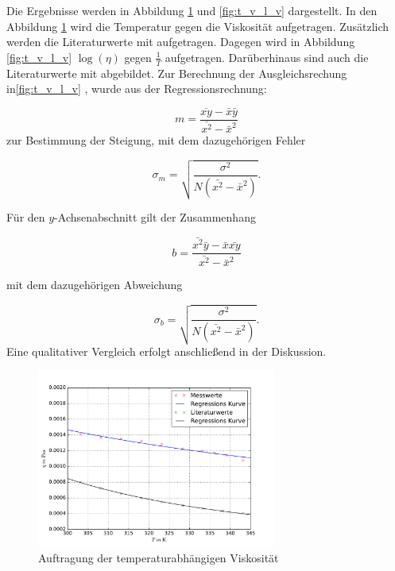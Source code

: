 Die Ergebnisse werden in Abbildung \ref{fig:t_v_v} und \ref{fig:t_v_l_v} dargestellt.
In den Abbildung \ref{fig:t_v_v} wird die Temperatur gegen die Viskosität aufgetragen.
Zusätzlich werden die Literaturwerte \cite{lit_dichte} mit aufgetragen.
Dagegen wird in Abbildung \ref{fig:t_v_l_v} $\log(\eta)$ gegen $\frac{1}{T}$ aufgetragen.
Darüberhinaus sind auch die Literaturwerte \cite{lit_dichte} mit abgebildet.
Zur Berechnung der Ausgleichsrechung in\ref{fig:t_v_l_v} , wurde aus der Regressionsrechnung:

\begin{equation*}
m=\frac{\overline{xy}-\bar{x}\bar{y}}{\bar{x^2}-\bar{x}^2}
\end{equation*}
zur Bestimmung der Steigung, mit dem dazugehörigen Fehler

\begin{equation*}
\sigma_m=\sqrt{\frac{\sigma^2}{N(\bar{x^2}-\bar{x}^2)}}.
\end{equation*}

Für den $y$-Achsenabschnitt gilt der Zusammenhang

\begin{equation*}
b=\frac{\bar{x^2}\bar{y}-\bar{x}\bar{xy}}{\bar{x^2}-\bar{x}^2}
\end{equation*}

mit dem dazugehörigen Abweichung

\begin{equation*}
\sigma_b=\sqrt{\frac{\sigma^2}{N\left(\bar{x^2}-\bar{x}^2\right)}}.
\end{equation*}
Eine qualitativer Vergleich erfolgt anschließend in der Diskussion. %

\FloatBarrier
\begin{figure}
\centering
\includegraphics[width=0.7\textwidth]{pics/viskositaet_temp_mit_lit.pdf}
\caption{Auftragung der temperaturabhängigen Viskosität} %
\label{fig:t_v_v}
\end{figure}

